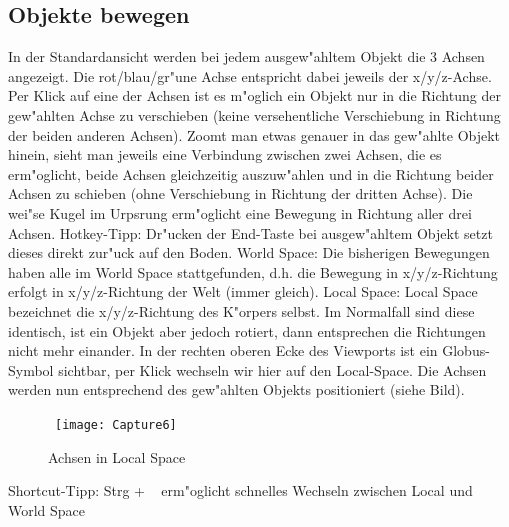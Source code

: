 \documentclass[11pt, titlepage]{article}
\begin{document}
\newpage

\subsection{Objekte bewegen}

\noindent In der Standardansicht werden bei jedem ausgew"ahltem Objekt die 3 Achsen angezeigt. Die rot/blau/gr"une Achse entspricht dabei jeweils der x/y/z-Achse. Per Klick auf eine der Achsen ist es m"oglich ein Objekt nur in die Richtung der gew"ahlten Achse zu verschieben (keine versehentliche Verschiebung in Richtung der beiden anderen Achsen). \newline
\noindent Zoomt man etwas genauer in das gew"ahlte Objekt hinein, sieht man jeweils eine Verbindung zwischen zwei Achsen, die es erm"oglicht, beide Achsen gleichzeitig auszuw"ahlen und in die Richtung beider Achsen zu schieben (ohne Verschiebung in Richtung der dritten Achse).\newline
\noindent Die wei"se Kugel im Urpsrung erm"oglicht eine Bewegung in Richtung aller drei Achsen. \newline
\newline
\noindent Hotkey-Tipp: Dr"ucken der End-Taste bei ausgew"ahltem Objekt setzt dieses direkt zur"uck auf den Boden. \newline
\newline
\noindent World Space: Die bisherigen Bewegungen haben alle im World Space stattgefunden, d.h. die Bewegung in x/y/z-Richtung erfolgt in x/y/z-Richtung  der Welt (immer gleich).  \newline
\noindent Local Space: Local Space bezeichnet die x/y/z-Richtung des K"orpers selbst. Im Normalfall sind diese identisch, ist ein Objekt aber jedoch rotiert, dann entsprechen die Richtungen nicht mehr einander. \newline
\newpage
\noindent In der rechten oberen Ecke des Viewports ist ein Globus-Symbol sichtbar, per Klick wechseln wir hier auf den Local-Space. Die Achsen werden nun entsprechend des gew"ahlten Objekts positioniert (siehe Bild). \newline
\newline
\newline
\begin{figure}
\
\texttt{[image: Capture6]}
\caption{Achsen in Local Space}
\end{figure}
\newline
\noindent Shortcut-Tipp: Strg + ~ erm"oglicht schnelles Wechseln zwischen Local und World Space \newline
\end{document}
